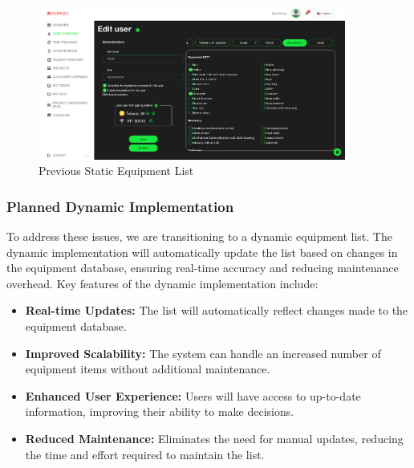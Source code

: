     \begin{figure}[H]
        \centering
        \includegraphics[width=0.9\textwidth]{src/assets/chapters/StaticDynamicEquipementList.png}
        \caption{Previous Static Equipment List}
        \label{fig:static_equipment_list}
    \end{figure}
    
    \subsubsection{Planned Dynamic Implementation}
    To address these issues, we are transitioning to a dynamic equipment list. The dynamic implementation will automatically update the list based on changes in the equipment database, ensuring real-time accuracy and reducing maintenance overhead. Key features of the dynamic implementation include:
    \begin{itemize}
        \item \textbf{Real-time Updates:} The list will automatically reflect changes made to the equipment database.
        \item \textbf{Improved Scalability:} The system can handle an increased number of equipment items without additional maintenance.
        \item \textbf{Enhanced User Experience:} Users will have access to up-to-date information, improving their ability to make decisions.
        \item \textbf{Reduced Maintenance:} Eliminates the need for manual updates, reducing the time and effort required to maintain the list.
    \end{itemize}
    
